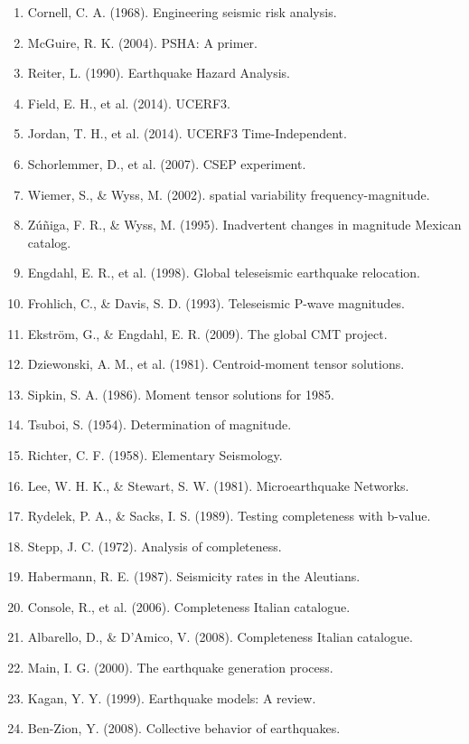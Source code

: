 \documentclass[12pt,a4paper]{article}
\begin{document}
\begin{enumerate}
    \item Cornell, C. A. (1968). Engineering seismic risk analysis.
    \item McGuire, R. K. (2004). PSHA: A primer.
    \item Reiter, L. (1990). Earthquake Hazard Analysis.
    \item Field, E. H., et al. (2014). UCERF3.
    \item Jordan, T. H., et al. (2014). UCERF3 Time-Independent.
    \item Schorlemmer, D., et al. (2007). CSEP experiment.
    \item Wiemer, S., \& Wyss, M. (2002). spatial variability frequency-magnitude.
    \item Zúñiga, F. R., \& Wyss, M. (1995). Inadvertent changes in magnitude Mexican catalog.
    \item Engdahl, E. R., et al. (1998). Global teleseismic earthquake relocation.
    \item Frohlich, C., \& Davis, S. D. (1993). Teleseismic P-wave magnitudes.
    \item Ekström, G., \& Engdahl, E. R. (2009). The global CMT project.
    \item Dziewonski, A. M., et al. (1981). Centroid-moment tensor solutions.
    \item Sipkin, S. A. (1986). Moment tensor solutions for 1985.
    \item Tsuboi, S. (1954). Determination of magnitude.
    \item Richter, C. F. (1958). Elementary Seismology.
    \item Lee, W. H. K., \& Stewart, S. W. (1981). Microearthquake Networks.
    \item Rydelek, P. A., \& Sacks, I. S. (1989). Testing completeness with b-value.
    \item Stepp, J. C. (1972). Analysis of completeness.
    \item Habermann, R. E. (1987). Seismicity rates in the Aleutians.
    \item Console, R., et al. (2006). Completeness Italian catalogue.
    \item Albarello, D., \& D'Amico, V. (2008). Completeness Italian catalogue.
    \item Main, I. G. (2000). The earthquake generation process.
    \item Kagan, Y. Y. (1999). Earthquake models: A review.
    \item Ben-Zion, Y. (2008). Collective behavior of earthquakes.

\end{enumerate}
\end{document}

